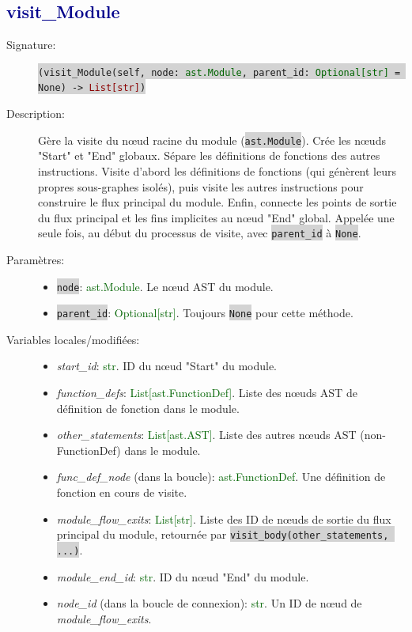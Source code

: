 \documentclass[11pt,a4paper]{article}
\newcommand{\code}[1]{\colorbox{lightgray}{\texttt{\small #1}}}
\newcommand{\var}[1]{\textit{#1}}
\newcommand{\vartype}[1]{\textcolor{darkgreen}{#1}}
\newcommand{\methodname}[1]{\textbf{\textcolor{darkblue}{#1}}}
\newcommand{\param}[1]{\code{#1}}
\newcommand{\rettype}[1]{\textcolor{darkred}{#1}}
\begin{document}
\subsection*{\methodname{visit\_Module}}
\begin{description}
    \item[Signature:] \code{(visit\_Module(self, node: \vartype{ast.Module}, parent\_id: \vartype{Optional[str]} = None) -> \rettype{List[str]})}
    \item[Description:] Gère la visite du nœud racine du module (\code{ast.Module}). Crée les nœuds "Start" et "End" globaux. Sépare les définitions de fonctions des autres instructions. Visite d'abord les définitions de fonctions (qui génèrent leurs propres sous-graphes isolés), puis visite les autres instructions pour construire le flux principal du module. Enfin, connecte les points de sortie du flux principal et les fins implicites au nœud "End" global. Appelée une seule fois, au début du processus de visite, avec \param{parent\_id} à \code{None}.
    \item[Paramètres:]
    \begin{itemize}
        \item \param{node}: \vartype{ast.Module}. Le nœud AST du module.
        \item \param{parent\_id}: \vartype{Optional[str]}. Toujours \code{None} pour cette méthode.
    \end{itemize}
    \item[Variables locales/modifiées:]
    \begin{itemize}
        \item \var{start\_id}: \vartype{str}. ID du nœud "Start" du module.
        \item \var{function\_defs}: \vartype{List[ast.FunctionDef]}. Liste des nœuds AST de définition de fonction dans le module.
        \item \var{other\_statements}: \vartype{List[ast.AST]}. Liste des autres nœuds AST (non-FunctionDef) dans le module.
        \item \var{func\_def\_node} (dans la boucle): \vartype{ast.FunctionDef}. Une définition de fonction en cours de visite.
        \item \var{module\_flow\_exits}: \vartype{List[str]}. Liste des ID de nœuds de sortie du flux principal du module, retournée par \code{visit\_body(other\_statements, ...)}.
        \item \var{module\_end\_id}: \vartype{str}. ID du nœud "End" du module.
        \item \var{node\_id} (dans la boucle de connexion): \vartype{str}. Un ID de nœud de \var{module\_flow\_exits}.
    \end{itemize}
\end{description}
\end{document}
